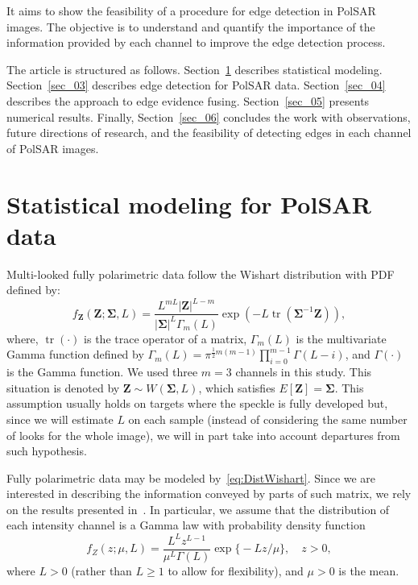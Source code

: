 \documentclass[journal]{IEEEtran}
\DeclareMathOperator{\traco}{tr}
\begin{document}
It aims to show the feasibility of a procedure for edge detection in PolSAR images. 
The objective is to understand and quantify the importance of the information provided by each channel to improve the edge detection process.

The article is structured as follows.
Section~\ref{sec_02} describes statistical modeling.
Section~\ref{sec_03} describes edge detection for PolSAR data.
Section~\ref{sec_04} describes the approach to edge evidence fusing.
Section~\ref{sec_05} presents numerical results.
Finally, Section~\ref{sec_06} concludes the work with observations, future directions of research, and the feasibility of detecting edges in each channel of PolSAR images.

\section{Statistical modeling for PolSAR data}\label{sec_02}

Multi-looked fully polarimetric data follow the Wishart distribution with PDF defined by:
\begin{equation}
    f_{\mathbf{Z}}(\mathbf{Z};\mathbf{\Sigma},L)=\frac{L^{mL}|\mathbf{Z}|^{L-m}}{|\mathbf{\Sigma}|^{L}\Gamma_m(L)} \exp(-L\traco(\mathbf{\Sigma}^{-1}\mathbf{Z})),
    \label{eq:DistWishart}
\end{equation} 
where, $\traco(\cdot)$ is the trace operator of a matrix, $\Gamma_m(L)$ is the multivariate Gamma function defined by $
	\Gamma_m(L)=\pi^{\frac{1}{2}m(m-1)} \prod_{i=0}^{m-1}\Gamma(L-i)$,
and $\Gamma(\cdot)$ is the Gamma function.
We used three $m=3$ channels in this study. 
This situation is denoted by $\mathbf{Z}\sim W(\mathbf{\Sigma}, L)$, which satisfies $E[\mathbf{Z}]=\mathbf{\Sigma}$. 
This assumption usually holds on targets where the speckle is fully developed but, since we will estimate $L$ on each sample (instead of considering the same number of looks for the whole image), we will in part take into account departures from such hypothesis.

Fully polarimetric data may be modeled by~\eqref{eq:DistWishart}.
Since we are interested in describing the information conveyed by parts of such matrix, we rely on the results presented in~\cite{lee,hsbmp}.
In particular, we assume that the distribution of each intensity channel is a 
Gamma law with probability density function
\begin{equation}
f_Z(z;\mu,L)=\frac{L^{L}z^{L-1}}{\mu^{L}\Gamma(L)} \exp\big\{-Lz/\mu\big\},\quad z>0,
\label{func_dens_uni_gamma}
\end{equation}
where $L>0$ (rather than $L\geq1$ to allow for flexibility), and
$\mu>0$ is the mean.
\end{document}
